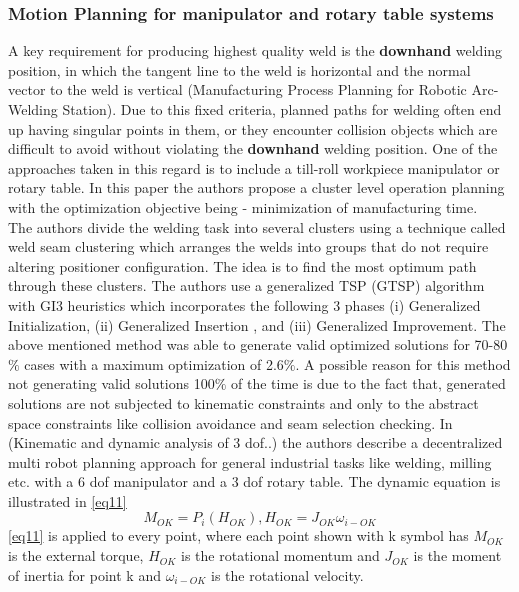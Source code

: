 \subsubsection{Motion Planning for manipulator and rotary table systems}
A key requirement for producing highest quality weld is the \textbf{downhand} welding position, in which the tangent line to the weld is horizontal and the normal vector to the weld is vertical \cite{5}(Manufacturing Process Planning for Robotic Arc-Welding Station). Due to this fixed criteria, planned paths for welding often end up having singular points in them, or they encounter collision objects which are difficult to avoid without violating the \textbf{downhand} welding position. One of the approaches taken in this regard is to include a till-roll workpiece manipulator or rotary table. In this paper \cite{5} the authors propose a cluster level operation planning with the optimization objective being - minimization of manufacturing time. \\
The authors divide the welding task into several clusters using a technique called weld seam clustering which arranges the welds into groups that do not require altering positioner configuration. The idea is to find the most optimum path through these clusters. The authors use a generalized TSP (GTSP) algorithm with GI3 heuristics which incorporates the following 3 phases (i) Generalized Initialization, (ii) Generalized Insertion , and (iii) Generalized Improvement. The above mentioned method was able to generate valid optimized solutions for 70-80$\%$ cases with a maximum optimization of 2.6$\%$. A possible reason for this method not generating valid solutions 100$\%$ of the time is due to the fact that, generated solutions are not subjected to kinematic constraints and only to the abstract space constraints like collision avoidance and seam selection checking.
In \cite{13}(Kinematic and dynamic analysis of 3 dof..) the authors describe a decentralized multi robot planning approach for general industrial tasks like welding, milling etc. with a 6 dof manipulator and a 3 dof rotary table. The dynamic equation is illustrated in \eqref{eq11}
\begin{equation}
\label{eq11}
M_{OK} = P_{i}(H_{OK}),H_{OK} = J_{OK}\omega_{i - OK}
\end{equation}
\eqref{eq11} is applied to every point, where each point shown with k symbol has $M_{OK}$ is the external torque, $H_{OK}$ is the rotational momentum and $J_{OK}$ is the moment of inertia for point k and $\omega_{i - OK}$ is the rotational velocity. 

